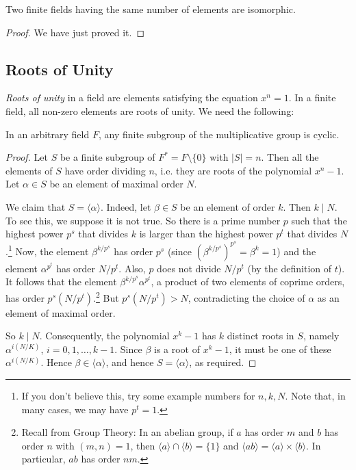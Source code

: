 \begin{theorem}
	Two finite fields having the same number of elements are isomorphic.
	\begin{proof}
		We have just proved it.
	\end{proof}
\end{theorem}

\subsection{Roots of Unity}
\emph{Roots of unity} in a field are elements satisfying the equation $x^n = 1$. In a finite field, all non-zero elements are roots of unity. We need the following:

\begin{lemma}\label{lem:finite-mult-subgroup-is-cyclic}
	In an arbitrary field $F$, any finite subgroup of the multiplicative group is cyclic.
	\begin{proof}
		Let $S$ be a finite subgroup of $F^* = F \setminus \{0\}$ with $|S| = n$. Then all the elements of $S$ have order dividing $n$, i.e. they are roots of the polynomial $x^n - 1$. Let $\alpha \in S$ be an element of maximal order $N$.
		
		We claim that $S = \langle \alpha \rangle$. Indeed, let $\beta \in S$ be an element of order $k$. Then $k \mid N$. To see this, we suppose it is not true. So there is a prime number $p$ such that the highest power $p^s$ that divides $k$ is larger than the highest power $p^t$ that divides $N$.\footnote{If you don't believe this, try some example numbers for $n, k, N$. Note that, in many cases, we may have $p^t = 1$.} Now, the element $\beta^{k / p^s}$ has order $p^s$ (since $(\beta^{k / p^s})^{p^s} = \beta^k = 1$) and the element $\alpha^{p^t}$ has order $N / p^t$. Also, $p$ does not divide $N / p^t$ (by the definition of $t$). It follows that the element $\beta^{k / p^s} \alpha^{p^t}$, a product of two elements of coprime orders, has order $p^s (N / p^t)$.\footnote{Recall from Group Theory: In an abelian group, if $a$ has order $m$ and $b$ has order $n$ with $(m, n) = 1$, then $\langle a \rangle \cap \langle b \rangle = \{1\}$ and $\langle ab \rangle = \langle a \rangle \times \langle b \rangle$. In particular, $ab$ has order $nm$.} But $p^s (N / p^t) > N$, contradicting the choice of $\alpha$ as an element of maximal order.
		
		So $k \mid N$. Consequently, the polynomial $x^k - 1$ has $k$ distinct roots in $S$, namely $\alpha^{i(N / K)}$, $i = 0, 1, \dots, k - 1$. Since $\beta$ is a root of $x^k - 1$, it must be one of these $\alpha^{i(N / K)}$. Hence $\beta \in \langle \alpha \rangle$, and hence $S = \langle \alpha \rangle$, as required.
	\end{proof}
\end{lemma}

